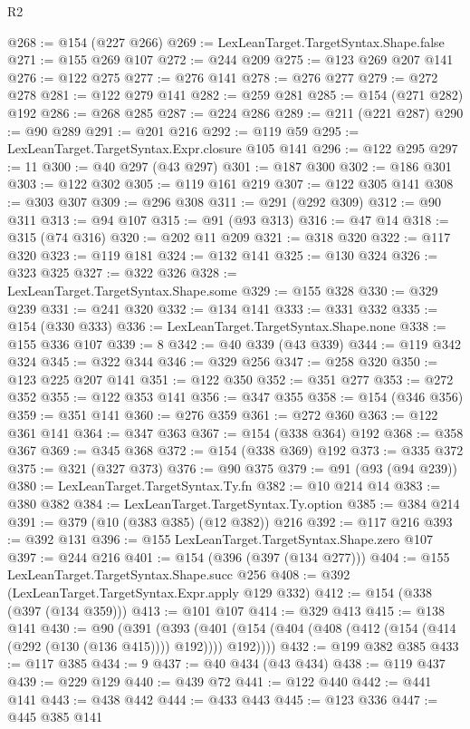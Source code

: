 \begin{lexlean}{R2}
\begin{coremodule}
{{{{{{{{{{{{{{{{{{{{{{{{{{{{{{{{{{{{{{{{{{{{{{{{{{{{{{{{{{{{{{{{{{{{{{{{{{{{{{{{{{{{{{{{{{{{@268 := @154 (@227 @266)
@269 := LexLeanTarget.TargetSyntax.Shape.false
@271 := @155 @269 @107
@272 := @244 @209
@275 := @123 @269 @207 @141
@276 := @122 @275
@277 := @276 @141
@278 := @276 @277
@279 := @272 @278
@281 := @122 @279 @141
@282 := @259 @281
@285 := @154 (@271 @282) @192
@286 := @268 @285
@287 := @224 @286
@289 := @211 (@221 @287)
@290 := @90 @289
@291 := @201 @216
@292 := @119 @59
@295 := LexLeanTarget.TargetSyntax.Expr.closure @105 @141
@296 := @122 @295
@297 := 11
@300 := @40 @297 (@43 @297)
@301 := @187 @300
@302 := @186 @301
@303 := @122 @302
@305 := @119 @161 @219
@307 := @122 @305 @141
@308 := @303 @307
@309 := @296 @308
@311 := @291 (@292 @309)
@312 := @90 @311
@313 := @94 @107
@315 := @91 (@93 @313)
@316 := @47 @14
@318 := @315 (@74 @316)
@320 := @202 @11 @209
@321 := @318 @320
@322 := @117 @320
@323 := @119 @181
@324 := @132 @141
@325 := @130 @324
@326 := @323 @325
@327 := @322 @326
@328 := LexLeanTarget.TargetSyntax.Shape.some
@329 := @155 @328
@330 := @329 @239
@331 := @241 @320
@332 := @134 @141
@333 := @331 @332
@335 := @154 (@330 @333)
@336 := LexLeanTarget.TargetSyntax.Shape.none
@338 := @155 @336 @107
@339 := 8
@342 := @40 @339 (@43 @339)
@344 := @119 @342 @324
@345 := @322 @344
@346 := @329 @256
@347 := @258 @320
@350 := @123 @225 @207 @141
@351 := @122 @350
@352 := @351 @277
@353 := @272 @352
@355 := @122 @353 @141
@356 := @347 @355
@358 := @154 (@346 @356)
@359 := @351 @141
@360 := @276 @359
@361 := @272 @360
@363 := @122 @361 @141
@364 := @347 @363
@367 := @154 (@338 @364) @192
@368 := @358 @367
@369 := @345 @368
@372 := @154 (@338 @369) @192
@373 := @335 @372
@375 := @321 (@327 @373)
@376 := @90 @375
@379 := @91 (@93 (@94 @239))
@380 := LexLeanTarget.TargetSyntax.Ty.fn
@382 := @10 @214 @14
@383 := @380 @382
@384 := LexLeanTarget.TargetSyntax.Ty.option
@385 := @384 @214
@391 := @379 (@10 (@383 @385) (@12 @382)) @216
@392 := @117 @216
@393 := @392 @131
@396 := @155 LexLeanTarget.TargetSyntax.Shape.zero @107
@397 := @244 @216
@401 := @154 (@396 (@397 (@134 @277)))
@404 := @155 LexLeanTarget.TargetSyntax.Shape.succ @256
@408 := @392 (LexLeanTarget.TargetSyntax.Expr.apply @129 @332)
@412 := @154 (@338 (@397 (@134 @359)))
@413 := @101 @107
@414 := @329 @413
@415 := @138 @141
@430 := @90
    (@391
      (@393 (@401 (@154 (@404 (@408 (@412 (@154 (@414 (@292 (@130 (@136 @415)))) @192)))) @192))))
@432 := @199 @382 @385
@433 := @117 @385
@434 := 9
@437 := @40 @434 (@43 @434)
@438 := @119 @437
@439 := @229 @129
@440 := @439 @72
@441 := @122 @440
@442 := @441 @141
@443 := @438 @442
@444 := @433 @443
@445 := @123 @336
@447 := @445 @385 @141
}}}}}}}}}}}}}}}}}}}}}}}}}}}}}}}}}}}}}}}}}}}}}}}}}}}}}}}}}}}}}}}}}}}}}}}}}}}}}}}}}}}}}}}}}}}}
\end{coremodule}
\end{lexlean}
